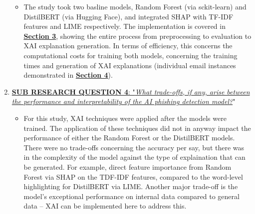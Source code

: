 \begin{enumerate}
  \begin{itemize}
    \item The study took two basline models, Random Forest (via sckit-learn) and DistilBERT (via Hugging Face), and integrated SHAP with TF-IDF features and LIME respectively. The implementation is covered in \hyperref[sec:3-research-methodology]{\uline{\textbf{Section 3}}}, showing the entire process from preprocessing to evaluation to XAI explanation generation. In terms of efficiency, this concerns the computational costs for training both models, concerning the training times and generation of XAI explanations (individual email instances demonstrated in \hyperref[sec:4-results]{\uline{\textbf{Section 4}}}).
  \end{itemize}
\item \uline{\textbf{SUB RESEARCH QUESTION 4}: "\textit{What trade-offs, if any, arise between the performance and interpretability of the AI phishing detection model?}}"
  \begin{itemize}
    \item For this study, XAI techniques were applied after the models were trained. The application of these techniques did not in anyway impact the performance of either the Random Forest or the DistilBERT models. There were no trade-offs concerning the accuracy per say, but there was in the complexity of the model against the type of explaination that can be generated. For example, direct feature importance from Random Forest via SHAP on the TDF-IDF features, compared to the word-level highlighting for DistilBERT via LIME. Another major trade-off is the model's exceptional performance on internal data compared to general data -- XAI can be implemented here to address this.
  \end{itemize}
\end{enumerate}
